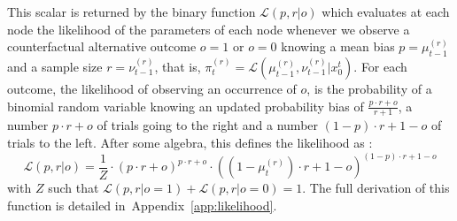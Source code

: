 \documentclass[12pt,english]{article}%
\newcommand{\eq}[1]{\begin{equation*}#1\end{equation*}}
\newcommand{\eql}[1]{\begin{equation}#1\end{equation}}
\newcommand{\Ll}{\mathcal{L}}
\newcommand{\seeApp}[1]{Appendix~\ref{app:#1}}
\begin{document}
This scalar is returned by the binary function 
$\Ll(p, r | o)$ which evaluates at each node the likelihood of the parameters of each node
whenever we observe a counterfactual alternative outcome $o=1$ or $o=0$
knowing a mean bias $p=\mu^{(r)}_{t-1}$
and a sample size $r=\nu^{(r)}_{t-1}$,
that is, $\pi^{(r)}_t = \Ll( \mu^{(r)}_{t-1}, \nu^{(r)}_{t-1} | x_0^{t})$.
For each outcome, the likelihood of observing an occurrence of $o$,
is the probability of a binomial random variable knowing
an updated probability bias of $\frac{p \cdot r + o}{r+1}$,
a number $p \cdot r + o$ of trials going to the right and
a number $(1-p) \cdot r + 1 - o$ of trials to the left.
After some algebra, this defines the likelihood as :
\eql{
\Ll(p, r| o) = \frac{1}{Z} \cdot {(p \cdot r + o)}^{p \cdot r + o} \cdot {((1- \mu^{(r)}_{t})\cdot r + 1- o)}^{(1- p)\cdot r + 1- o}
\label{eq:likelihood}
}
with $Z$ such that $\Ll(p, r|o=1) + \Ll(p, r|o=0)=1$. %
The full derivation of this function is detailed in~\seeApp{likelihood}.
\end{document}
